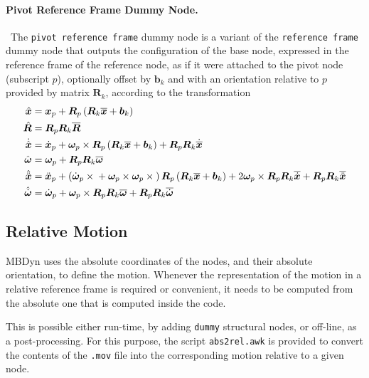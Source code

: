 \documentclass[10pt,fleqn,subeqn]{report}
\newcommand{\T}[1]{\bm{#1}}
\newcommand{\TT}[1]{\bm{#1}}
\begin{document}
\paragraph{Pivot Reference Frame Dummy Node.} \
The \texttt{pivot reference frame} dummy node is a variant
of the \texttt{reference frame} dummy node that outputs
the configuration of the base node, expressed in the reference
frame of the reference node, as if it were attached to the pivot node
(subscript $p$), optionally offset by $\T{b}_k$ and with
an orientation relative to $p$ provided by matrix $\T{R}_k$,
according to the transformation
\begin{subequations}
\begin{align}
	\hat{\T{x}} &= \T{x}_p + \T{R}_p\plbr{\T{R}_k \overline{\T{x}} + \T{b}_k} \\
	\hat{\T{R}} &= \T{R}_p \T{R}_k \overline{\T{R}} \\
	\dot{\hat{\T{x}}} &= \dot{\T{x}}_p
		+ \T{\omega}_p \times\T{R}_p \plbr{
			\T{R}_k \overline{\T{x}} + \T{b}_k
		} + \T{R}_p \T{R}_k \dot{\overline{\T{x}}} \\
	\hat{\T{\omega}} &= \T{\omega}_p + \T{R}_p \T{R}_k \overline{\T{\omega}} \\
	\hat{\ddot{\T{x}}} &= \ddot{\T{x}}_p
		+ \plbr{
			\dot{\T{\omega}}_p \times{}
			+ \T{\omega}_p \times \T{\omega}_p \times{}
		} \TT{R}_p \plbr{
			\TT{R}_k \overline{\T{x}} + \T{b}_k
		}
		+ 2 \T{\omega}_p \times \TT{R}_p \TT{R}_k \overline{\dot{\T{x}}}
		+ \TT{R}_p \TT{R}_k \overline{\ddot{\T{x}}} \\
	\hat{\dot{\T{\omega}}} &= \dot{\T{\omega}}_p
		+ \T{\omega}_p \times \TT{R}_p \TT{R}_k \overline{\T{\omega}}
		+ \TT{R}_p \TT{R}_k \overline{\dot{\T{\omega}}}
\end{align}
\end{subequations}


\subsection{Relative Motion}
\label{sec:nodes:structural nodes:relative motion}
MBDyn uses the absolute coordinates of the nodes,
and their absolute orientation, to define the motion.
Whenever the representation of the motion in a relative reference frame
is required or convenient, it needs to be computed
from the absolute one that is computed inside the code.

This is possible either run-time, by adding \texttt{dummy} structural nodes,
or off-line, as a post-processing.
For this purpose, the script \texttt{abs2rel.awk} is provided
to convert the contents of the \texttt{.mov} file
into the corresponding motion relative to a given node.
\end{document}
